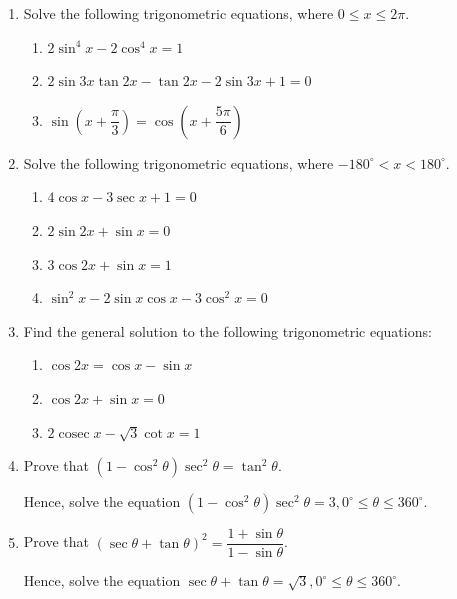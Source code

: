 \documentclass{report}
\begin{document}
\begin{enumerate}
	\item Solve the following trigonometric equations, where $0 \leq x \leq 2 \pi$.
	      \begin{enumerate}
	      	\item $2 \sin ^4 x - 2 \cos ^4 x = 1$
	      	\item $2 \sin 3x \tan 2x - \tan 2x - 2 \sin 3x + 1 = 0$
	      	\item $\sin \left(x + \dfrac{\pi}{3}\right) = \cos \left(x + \dfrac{5 \pi}{6}\right)$
	      \end{enumerate}
	      
	      
	\item  Solve the following trigonometric equations, where $-180^{\circ} < x < 180^{\circ}$.
	      
	      \begin{enumerate}
	      	\item $4 \cos x - 3 \sec x + 1 = 0$
	      	\item $2 \sin 2x + \sin x = 0$
	      	\item $3 \cos 2x + \sin x = 1$
	      	\item $\sin^2 x - 2 \sin x \cos x - 3 \cos^2 x = 0$
	      \end{enumerate}
	      
	\item  Find the general solution to the following trigonometric equations:
	      
	      \begin{enumerate}
	      	\item $\cos 2x = \cos x - \sin x$
	      	          
	      	\item $\cos 2x + \sin x = 0$
	      	          
	      	\item $2 \operatorname{cosec} x - \sqrt{3} \cot x = 1$
	      \end{enumerate}
	      
	\item Prove that $\left(1 - \cos^2 \theta\right) \sec^2 \theta = \tan^2 \theta$.
	      
	      Hence, solve the equation $\left(1 - \cos^2 \theta\right) \sec^2 \theta = 3, 0^{\circ} \leq \theta \leq 360^{\circ}$.
	      
	\item Prove that $(\sec \theta + \tan \theta)^2 = \dfrac{1 + \sin \theta}{1 - \sin \theta}$.
	      
	      Hence, solve the equation $\sec \theta + \tan \theta = \sqrt{3}, 0^{\circ} \leq \theta \leq 360^{\circ}$.
	      

\end{enumerate}
\end{document}
